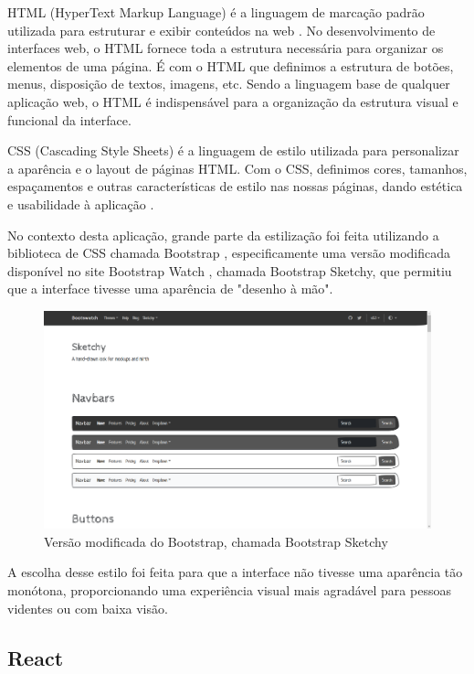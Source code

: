 HTML (HyperText Markup Language) é a linguagem de marcação padrão utilizada para estruturar e exibir conteúdos na web \parencite{SITE01}. No desenvolvimento de interfaces web, o HTML fornece toda a estrutura necessária para organizar os elementos de uma página. É com o HTML que definimos a estrutura de botões, menus, disposição de textos, imagens, etc. Sendo a linguagem base de qualquer aplicação web, o HTML é indispensável para a organização da estrutura visual e funcional da interface.

CSS (Cascading Style Sheets) é a linguagem de estilo utilizada para personalizar a aparência e o layout de páginas HTML. Com o CSS, definimos cores, tamanhos, espaçamentos e outras características de estilo nas nossas páginas, dando estética e usabilidade à aplicação \parencite{SITE02}.

No contexto desta aplicação, grande parte da estilização foi feita utilizando a biblioteca de CSS chamada Bootstrap \parencite{SITE05}, especificamente uma versão modificada disponível no site Bootstrap Watch \parencite{SITE06}, chamada Bootstrap Sketchy, que permitiu que a interface tivesse uma aparência de "desenho à mão". 

\begin{figure}[h]
    \centering
    \includegraphics[scale=0.25]{ch06/assets/bootstrap-sketchy.png}
    \decoRule
    \caption[Bootstrap Sketchy]{Versão modificada do Bootstrap, chamada Bootstrap Sketchy}
\end{figure}

A escolha desse estilo foi feita para que a interface não tivesse uma aparência tão monótona, proporcionando uma experiência visual mais agradável para pessoas videntes ou com baixa visão.

\subsection{React}

